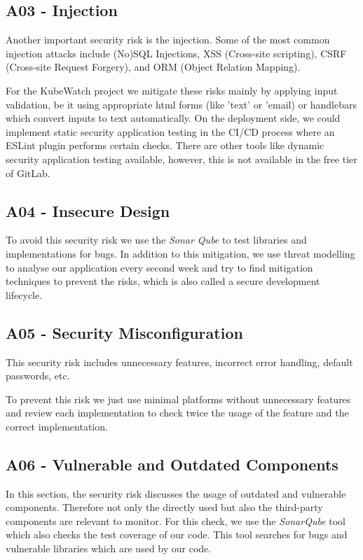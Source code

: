 \subsection{A03 - Injection}
Another important security risk is the injection. Some of the most common injection attacks include (No)SQL Injections, XSS (Cross-site scripting), CSRF (Cross-site Request Forgery), and ORM (Object Relation Mapping).

For the KubeWatch project we mitigate these risks mainly by applying input validation, be it using appropriate html forms (like 'text' or 'email) or handlebars which convert inputs to text automatically. On the deployment side, we could implement static security application testing in the CI/CD process where an ESLint plugin performs certain checks. There are other tools like dynamic security application testing available, however, this is not available in the free tier of GitLab.

\subsection{A04 - Insecure Design}
To avoid this security risk we use the \textit{Sonar Qube} to test libraries and implementations for bugs. In addition to this mitigation, we use threat modelling to analyse our application every second week and try to find mitigation techniques to prevent the risks, which is also called a secure development lifecycle.

\subsection{A05 - Security Misconfiguration}
This security risk includes unnecessary features, incorrect error handling, default passwords, etc.

To prevent this risk we just use minimal platforms without unnecessary features and review each implementation to check twice the usage of the feature and the correct implementation.

\subsection{A06 - Vulnerable and Outdated Components}
In this section, the security risk discusses the usage of outdated and vulnerable components. Therefore not only the directly used but also the third-party components are relevant to monitor. For this check, we use the \textit{SonarQube} tool which also checks the test coverage of our code. This tool searches for bugs and vulnerable libraries which are used by our code.

